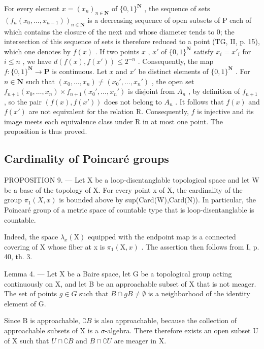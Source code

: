 For every element \(x = (x_n)_{n \in \mathbf{N}}\) of \(\{0,1\}^{\mathbf{N}}\) , the sequence of sets \((f_n(x_0, \ldots, x_{n-1}))_{n \in \mathbf{N}}\) is a decreasing sequence of open subsets of P each of which contains the closure of the next and whose diameter tends to 0; the intersection of this sequence of sets is therefore reduced to a point (TG, II, p. 15), which one denotes by \(f(x)\) . If two points \(x\) , \(x'\) of \(\{0,1\}^{\mathbf{N}}\) satisfy \(x_i = x'_i\) for \(i \leqslant n\) , we have \(d(f(x), f(x')) \leqslant 2^{-n}\) . Consequently, the map \(f: \{0,1\}^{\mathbf{N}} \to \mathbf{P}\) is continuous. Let \(x\) and \(x'\) be distinct elements of \(\{0,1\}^{\mathbf{N}}\) . For \(n \in \mathbf{N}\) such that \((x_0, \ldots, x_n) \neq (x_0', \ldots, x_n')\) , the open set \(f_{n+1}(x_0, \ldots, x_n) \times f_{n+1}(x_0', \ldots, x_n')\) is disjoint from \(A_n\) , by definition of \(f_{n+1}\) , so the pair \((f(x), f(x'))\) does not belong to \(A_n\) . It follows that \(f(x)\) and \(f(x')\) are not equivalent for the relation R. Consequently, \(f\) is injective and its image meets each equivalence class under R in at most one point. The proposition is thus proved.

\subsection{Cardinality of Poincaré groups}

PROPOSITION 9. --- Let X be a loop-disentanglable topological space and let W be a base of the topology of X. For every point x of X, the cardinality of the group \(\pi_{1}(X,x)\) is bounded above by sup(Card(W),Card(N)). In particular, the Poincaré group of a metric space of countable type that is loop-disentanglable is countable.

Indeed, the space \(\lambda_{x}(\mathrm{X})\) equipped with the endpoint map is a connected covering of X whose fiber at x is \(\pi_{1}(\mathrm{X}, x)\) . The assertion then follows from I, p. 40, th. 3.

Lemma 4. --- Let X be a Baire space, let G be a topological group acting continuously on X, and let B be an approachable subset of X that is not meager. The set of points \(g \in G\) such that \(B \cap gB \neq \emptyset\) is a neighborhood of the identity element of G.

Since B is approachable, \(\complement B\) is also approachable, because the collection of approachable subsets of X is a \(\sigma\)-algebra. There therefore exists an open subset U of X such that \(U \cap \complement B\) and \(B \cap \complement U\) are meager in X.

